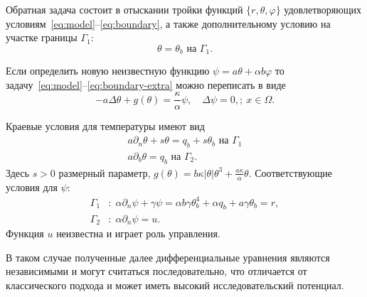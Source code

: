 Обратная задача состоит в отыскании тройки функций $\{r, \theta, \varphi\}$
удовлетворяющих условиям~\eqref{eq:model}--\eqref{eq:boundary}, а также дополнительному условию
на участке границы $\Gamma_1$:
\begin{equation}
    \label{eq:boundary-extra}
    \theta = \theta_b \text{ на } \Gamma_1.
\end{equation}


Если определить новую неизвестную функцию $\psi = a\theta + \alpha b \varphi$ то
задачу~\eqref{eq:model}--\eqref{eq:boundary-extra} можно переписать в виде
\begin{equation}
    \label{eq:model-psi}
    - a \Delta \theta + g (\theta) = \frac{\kappa}{\alpha}\psi, \quad
    \Delta \psi = 0, ;\ x \in \Omega.
\end{equation}

Краевые условия для температуры имеют вид
\begin{equation}
    \label{eq:boundary-psi-1}
    \begin{aligned}
        a \partial_n \theta + s \theta = q_b + s \theta_b \text{ на } \Gamma_1 \\
        a \partial_b \theta = q_b \text{ на } \Gamma_2.
    \end{aligned}
\end{equation}
Здесь $s > 0$ размерный параметр, $g(\theta) = b \kappa|\theta|\theta^3 + \frac{a\kappa}{\alpha}\theta$.
Соответствующие условия для $\psi$:
\begin{equation}
    \label{eq:boundary-psi-2}
    \begin{aligned}
        \Gamma_1 &: \; \alpha \partial_n \psi + \gamma \psi
        = \alpha b \gamma \theta_b^4
        + \alpha q_b + a \gamma \theta_b = r, \\
        \Gamma_2 &: \; \alpha \partial_n \psi = u.
    \end{aligned}
\end{equation}
Функция $u$ неизвестна и играет роль управления.

В таком случае полученные далее дифференциальные уравнения являются независимыми и
могут считаться последовательно,
что отличается от классического подхода и может иметь высокий исследовательский потенциал.

